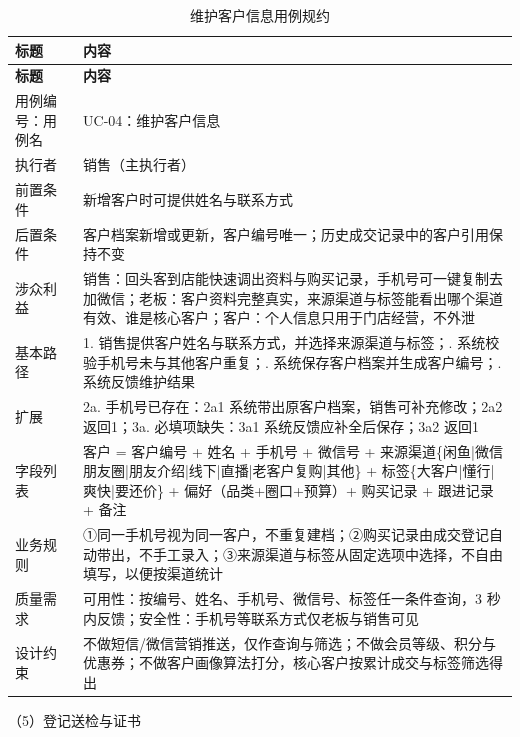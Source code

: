\documentclass[12pt, a4paper]{ctexart}
\begin{document}
{\small
\begin{longtable}{@{}p{2.4cm} p{12.9cm}@{}}
\caption{维护客户信息用例规约}\label{tab:uc-04}\\
\toprule
\textbf{标题} & \textbf{内容} \\
\midrule
\endfirsthead
\toprule
\textbf{标题} & \textbf{内容} \\
\midrule
\endhead
用例编号：用例名 & UC-04：维护客户信息 \\
\midrule
执行者 & 销售（主执行者） \\
\midrule
前置条件 & 新增客户时可提供姓名与联系方式 \\
\midrule
后置条件 & 客户档案新增或更新，客户编号唯一；历史成交记录中的客户引用保持不变 \\
\midrule
涉众利益 & 销售：回头客到店能快速调出资料与购买记录，手机号可一键复制去加微信；\newline 老板：客户资料完整真实，来源渠道与标签能看出哪个渠道有效、谁是核心客户；\newline 客户：个人信息只用于门店经营，不外泄 \\
\midrule
基本路径 & 1. 销售提供客户姓名与联系方式，并选择来源渠道与标签；\newline 2. 系统校验手机号未与其他客户重复；\newline 3. 系统保存客户档案并生成客户编号；\newline 4. 系统反馈维护结果 \\
\midrule
扩展 & 2a. 手机号已存在：2a1 系统带出原客户档案，销售可补充修改；2a2 返回1；\newline 3a. 必填项缺失：3a1 系统反馈应补全后保存；3a2 返回1 \\
\midrule
字段列表 & 客户 = 客户编号 + 姓名 + 手机号 + 微信号 + 来源渠道\{闲鱼|微信朋友圈|朋友介绍|线下|直播|老客户复购|其他\} + 标签\{大客户|懂行|爽快|要还价\} + 偏好（品类+圈口+预算）+ 购买记录 + 跟进记录 + 备注 \\
\midrule
业务规则 & ①同一手机号视为同一客户，不重复建档；\newline ②购买记录由成交登记自动带出，不手工录入；\newline ③来源渠道与标签从固定选项中选择，不自由填写，以便按渠道统计 \\
\midrule
质量需求 & 可用性：按编号、姓名、手机号、微信号、标签任一条件查询，3 秒内反馈；\newline 安全性：手机号等联系方式仅老板与销售可见 \\
\midrule
设计约束 & 不做短信/微信营销推送，仅作查询与筛选；不做会员等级、积分与优惠券；不做客户画像算法打分，核心客户按累计成交与标签筛选得出 \\
\midrule
\bottomrule
\end{longtable}}
\noindent（5）登记送检与证书
\end{document}
